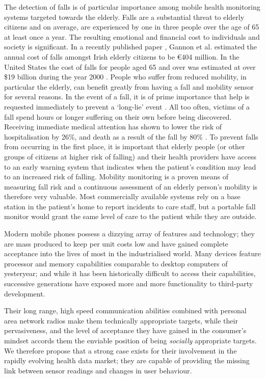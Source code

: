 \documentclass[conference,a4paper]{IEEEtran}
\begin{document}
The detection of falls is of particular importance among mobile health monitoring systems targeted towards the elderly. Falls are a substantial threat to elderly citizens and on average, are experienced by one in three people over the age of 65 at least once a year. The resulting emotional and financial cost to individuals and society is significant. In a recently published paper \cite{Gannon2008}, Gannon et al. estimated the annual cost of falls amongst Irish elderly citizens to be \euro 404 million. In the United States the cost of falls for people aged 65 and over was estimated at over \$19 billion during the year 2000 \cite{Stevens2006}. People who suffer from reduced mobility, in particular the elderly, can benefit greatly from having a fall and mobility sensor for several reasons.
In the event of a fall, it is of prime importance that help is requested immediately to prevent a `long-lie' event \cite{WildBMJ}. All too often, victims of a fall spend hours or longer suffering on their own before being discovered. Receiving immediate medical attention has shown to lower the risk of hospitalisation by 26\%, and death as a result of the fall by 80\% \cite{Noury2008}. To prevent falls from occurring in the first place, it is important that elderly people (or other groups of citizens at higher risk of falling) and their health providers have access to an early warning system that indicates when the patient's condition may lead to an increased risk of falling. Mobility monitoring is a proven means of measuring fall risk
and a continuous assessment of an elderly person's mobility is therefore very valuable. Most commercially available systems rely on a base station in the patient's home to report incidents to care staff, but a portable fall monitor would grant the same level of care to the patient while they are outside. 

Modern mobile phones possess a dizzying array of features and technology; they are mass produced to keep per unit costs low and have gained complete acceptance into the lives of most in the industrialised world.
Many devices feature processor and memory capabilities comparable to desktop computers of yesteryear; and while it has been historically difficult to access their capabilities, successive generations have exposed more and more functionality to third-party development.

Their long range, high speed communication abilities combined with personal area network radios make them technically appropriate targets, while their pervasiveness, and the level of acceptance they have gained in the consumer's mindset accords them the enviable position of being \textit{socially} appropriate targets.
We therefore propose that a strong case exists for their involvement in the rapidly evolving health data market; they are capable of providing the missing link between sensor readings and changes in user behaviour.
\end{document}
